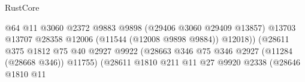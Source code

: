 \begin{lexlean}{RustCore}
\begin{coremodule}
                                                                @64
                                                                @11
                                                                @3060
                                                                @2372
                                                                @9883
                                                                @9898
                                                                (@29406 @3060 @29409 @13857)
                                                                @13703
                                                                @13707
                                                                @28358
                                                                @12006
                                                                (@11544 (@12008 @9898 @9884))
                                                                @12018))
                                                            (@28611
                                                              @375
                                                              @1812
                                                              @75
                                                              @40
                                                              @2927
                                                              @9922
                                                              (@28663
                                                                @346
                                                                @75
                                                                @346
                                                                @2927
                                                                (@11284 (@28668 @346))
                                                                @11755)
                                                              (@28611
                                                                @1810
                                                                @211
                                                                @11
                                                                @27
                                                                @9920
                                                                @2338
                                                                (@28646
                                                                  @1810
                                                                  @11

\end{coremodule}
\end{lexlean}
